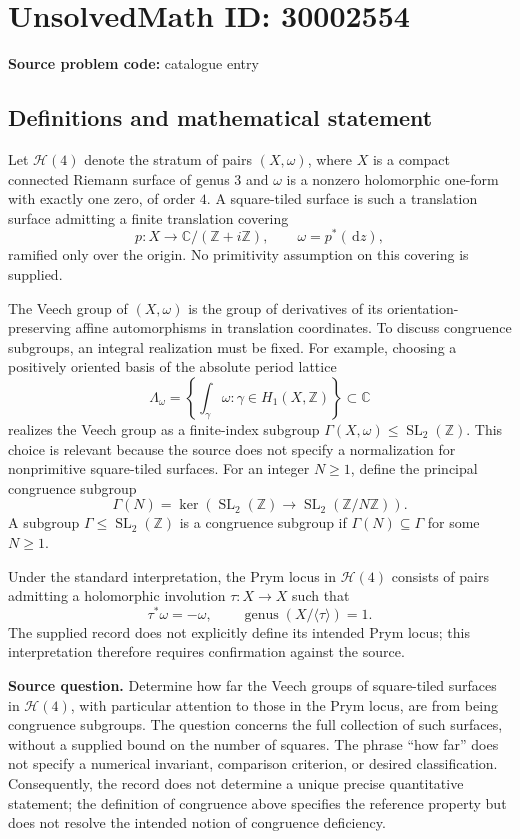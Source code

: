 \documentclass[11pt]{article}
\newcommand{\Z}{\mathbb{Z}}
\newcommand{\C}{\mathbb{C}}
\newcommand{\dd}{\,\mathrm{d}}
\begin{document}
\section*{UnsolvedMath ID: 30002554}
\textbf{Source problem code:} catalogue entry
\subsection{Definitions and mathematical statement}
Let \(\mathcal H(4)\) denote the stratum of pairs \((X,\omega)\), where \(X\) is a compact connected Riemann surface of genus \(3\) and \(\omega\) is a nonzero holomorphic one-form with exactly one zero, of order \(4\). A square-tiled surface is such a translation surface admitting a finite translation covering
\[
 p:X\longrightarrow \C/(\Z+i\Z),\qquad \omega=p^*(\dd z),
\]
ramified only over the origin. No primitivity assumption on this covering is supplied.

The Veech group of \((X,\omega)\) is the group of derivatives of its orientation-preserving affine automorphisms in translation coordinates. To discuss congruence subgroups, an integral realization must be fixed. For example, choosing a positively oriented basis of the absolute period lattice
\[
\Lambda_\omega=\left\{\int_\gamma\omega:\gamma\in H_1(X,\Z)\right\}\subset\C
\]
realizes the Veech group as a finite-index subgroup \(\Gamma(X,\omega)\leq\operatorname{SL}_2(\Z)\). This choice is relevant because the source does not specify a normalization for nonprimitive square-tiled surfaces. For an integer \(N\geq1\), define the principal congruence subgroup
\[
\Gamma(N)=\ker\!\left(\operatorname{SL}_2(\Z)\longrightarrow\operatorname{SL}_2(\Z/N\Z)\right).
\]
A subgroup \(\Gamma\leq\operatorname{SL}_2(\Z)\) is a congruence subgroup if \(\Gamma(N)\subseteq\Gamma\) for some \(N\geq1\).

Under the standard interpretation, the Prym locus in \(\mathcal H(4)\) consists of pairs admitting a holomorphic involution \(\tau:X\to X\) such that
\[
\tau^*\omega=-\omega,
\qquad \operatorname{genus}(X/\langle\tau\rangle)=1.
\]
The supplied record does not explicitly define its intended Prym locus; this interpretation therefore requires confirmation against the source.

\textbf{Source question.} Determine how far the Veech groups of square-tiled surfaces in \(\mathcal H(4)\), with particular attention to those in the Prym locus, are from being congruence subgroups. The question concerns the full collection of such surfaces, without a supplied bound on the number of squares. The phrase ``how far'' does not specify a numerical invariant, comparison criterion, or desired classification. Consequently, the record does not determine a unique precise quantitative statement; the definition of congruence above specifies the reference property but does not resolve the intended notion of congruence deficiency.
\end{document}
